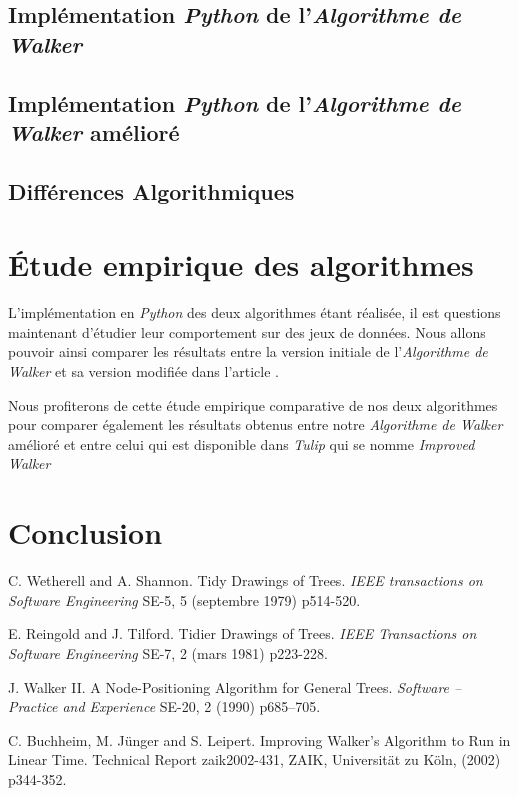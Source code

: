 \documentclass{article}
\begin{document}
\subsection{Implémentation \emph{Python} de l'\emph{Algorithme de Walker} \cite{article90}}

\subsection{Implémentation \emph{Python} de l'\emph{Algorithme de Walker} amélioré \cite{article02}}

\subsection{Différences Algorithmiques}


\newpage
\section{Étude empirique des algorithmes}

L'implémentation en \emph{Python} des deux algorithmes étant réalisée, il est questions maintenant d'étudier leur comportement sur des jeux de données. Nous allons pouvoir ainsi comparer les résultats entre la version initiale de  l'\emph{Algorithme de Walker} et sa version modifiée dans l'article \cite{article02}.

Nous profiterons de cette étude empirique comparative de nos deux algorithmes pour comparer également les résultats obtenus entre notre \emph{Algorithme de Walker} amélioré et entre celui qui est disponible dans \emph{Tulip} qui se nomme \emph{Improved Walker}


\newpage
\section{Conclusion}




\newpage
\medskip

\begin{thebibliography}{10}

C. Wetherell and A. Shannon. Tidy Drawings of Trees. \textit{IEEE transactions on Software Engineering} SE-5, 5 (septembre 1979) p514-520.

E. Reingold and J. Tilford. Tidier Drawings of Trees. \textit{IEEE Transactions on Software Engineering} SE-7, 2 (mars 1981) p223-228.

J. Walker II. A Node-Positioning Algorithm for General Trees. \textit{Software – Practice and Experience} SE-20, 2 (1990) p685–705.

C. Buchheim, M. Jünger and S. Leipert. Improving Walker’s Algorithm to Run in Linear Time. Technical Report zaik2002-431, ZAIK, Universität zu Köln, (2002) p344-352.

\end{thebibliography}
\end{document}
